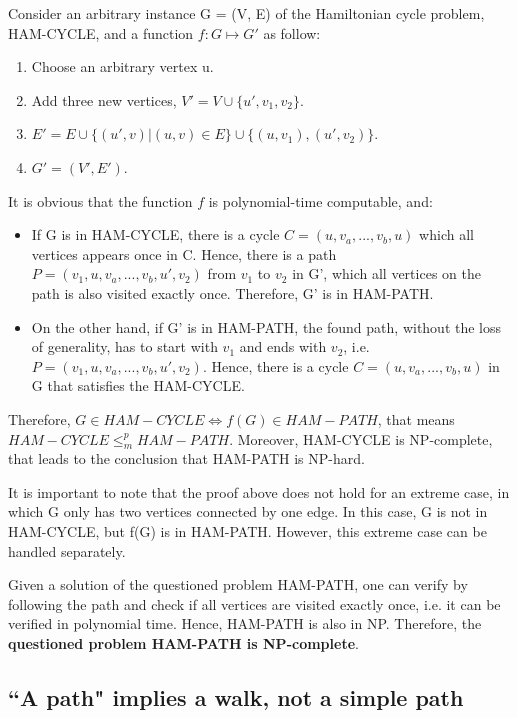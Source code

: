 \documentclass{article}
\begin{document}
Consider an arbitrary instance G = (V, E) of the Hamiltonian cycle problem, HAM-CYCLE, and a function $f: G\mapsto G'$ as follow:
\begin{enumerate}
    \item Choose an arbitrary vertex u.
    \item Add three new vertices, $V' = V\cup\{u',v_1,v_2\}$.
    \item $E' = E\cup\{(u',v)| (u,v)\in E\}\cup\{(u,v_1), (u',v_2)\}$.
    \item $G'=(V', E')$.
\end{enumerate}

It is obvious that the function $f$ is polynomial-time computable, and:
\begin{itemize}
    \item If G is in HAM-CYCLE, there is a cycle $C = (u, v_a,...,v_b,u)$ which all vertices appears once in C. Hence, there is a path $P=(v_1, u, v_a,...,v_b,u',v_2)$ from $v_1$ to $v_2$ in G', which all vertices on the path is also visited exactly once. Therefore, G' is in HAM-PATH.
    \item On the other hand, if G' is in HAM-PATH, the found path, without the loss of generality, has to start with $v_1$ and ends with $v_2$, i.e. $P=(v_1, u, v_a,...,v_b,u',v_2)$. Hence, there is a cycle $C = (u, v_a,...,v_b,u)$ in G that satisfies the HAM-CYCLE.
\end{itemize}

Therefore, $G \in HAM-CYCLE \Leftrightarrow f(G)\in HAM-PATH$, that means $HAM-CYCLE \le_m^p HAM-PATH$. Moreover, HAM-CYCLE is NP-complete, that leads to the conclusion that HAM-PATH is NP-hard.

It is important to note that the proof above does not hold for an extreme case, in which G only has two vertices connected by one edge. In this case, G is not in HAM-CYCLE, but f(G) is in HAM-PATH. However, this extreme case can be handled separately.

Given a solution of the questioned problem HAM-PATH, one can verify by following the path and check if all vertices are visited exactly once, i.e. it can be verified in polynomial time. Hence, HAM-PATH is also in NP. Therefore, the \textbf{questioned problem HAM-PATH is NP-complete}. 


\subsection{``A path" implies a walk, not a simple path}
\end{document}
